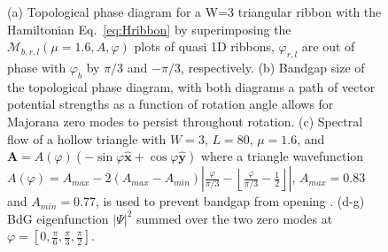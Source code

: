 \documentclass[aps,prb,showpacs,amsmath,amssymb,superscriptaddress]{revtex4-2}
\let\oldhat\hat
\renewcommand{\hat}[1]{\oldhat{\mathbf{#1}}}
\begin{document}
\begin{figure}[ht]
  \hspace{-31.5pt}
  \hspace{-31.5pt}
  \hspace{-31.5pt}
  \caption{(a) Topological phase diagram for a W=3 triangular ribbon with the Hamiltonian Eq.~\eqref{eq:Hribbon} by superimposing the $\mathcal{M}_{b,r,l}(\mu=1.6,A,\varphi)$ plots of quasi 1D ribbons, $\varphi_{r,l}$ are out of phase with $\varphi_b$ by $\pi/3$ and $-\pi/3$, respectively. (b) Bandgap size of the topological phase diagram, with both diagrams a path of vector potential strengths as a function of rotation angle allows for Majorana zero modes to persist throughout rotation.  (c) Spectral flow of a hollow triangle with $W=3$, $L=80$, $\mu=1.6$, and $\mathbf A = A(\varphi)(-\sin\varphi \hat{x} + \cos\varphi \hat{y})$ where a triangle wavefunction $A(\varphi) = A_{max} - 2(A_{max}-A_{min})\left|\frac{\varphi}{\pi/3} - \left\lfloor \frac{\varphi}{\pi/3} - \frac{1}{2} \right\rfloor\right|$, $A_{max} = 0.83$ and $A_{min} = 0.77$, is used to prevent bandgap from opening . (d-g) BdG eigenfunction $|\Psi|^2$ summed over the two zero modes at $\varphi = [0, \frac{\pi}{6}, \frac{\pi}{3}, \frac{\pi}{2}]$.}
  \label{fig: supp rotation}
\end{figure}
\end{document}
